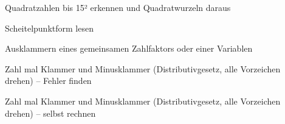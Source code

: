\begin{aufgabe}{Quadratzahlen bis 15² erkennen und Quadratwurzeln daraus}
\end{aufgabe}

\begin{aufgabe}{Scheitelpunktform lesen}
\end{aufgabe}

\begin{aufgabe}{Ausklammern eines gemeinsamen Zahlfaktors oder einer Variablen}
\end{aufgabe}

\begin{aufgabe}{Zahl mal Klammer und Minusklammer (Distributivgesetz, alle Vorzeichen drehen) – Fehler finden}
\end{aufgabe}

\begin{aufgabe}{Zahl mal Klammer und Minusklammer (Distributivgesetz, alle Vorzeichen drehen) – selbst rechnen}
\end{aufgabe}
